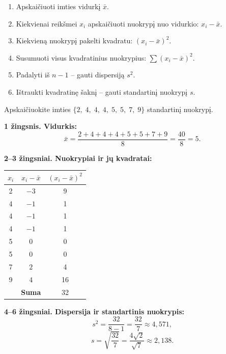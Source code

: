 \begin{enumerate}
  \item Apskaičiuoti imties vidurkį $\bar{x}$.
  \item Kiekvienai reikšmei $x_i$ apskaičiuoti nuokrypį nuo vidurkio: $x_i - \bar{x}$.
  \item Kiekvieną nuokrypį pakelti kvadratu: $(x_i - \bar{x})^2$.
  \item Susumuoti visus kvadratinius nuokrypius: $\sum(x_i - \bar{x})^2$.
  \item Padalyti iš $n - 1$ – gauti dispersiją $s^2$.
  \item Ištraukti kvadratinę šaknį – gauti standartinį nuokrypį $s$.
\end{enumerate}

\begin{example}
Apskaičiuokite imties $\{2,\; 4,\; 4,\; 4,\; 5,\; 5,\; 7,\; 9\}$ standartinį nuokrypį.

\textbf{1 žingsnis. Vidurkis:}
\[
  \bar{x} = \frac{2+4+4+4+5+5+7+9}{8} = \frac{40}{8} = 5.
\]

\textbf{2–3 žingsniai. Nuokrypiai ir jų kvadratai:}

\begin{center}
\begin{tabular}{|c|c|c|}
\hline
$x_i$ & $x_i - \bar{x}$ & $(x_i - \bar{x})^2$ \\
\hline
2 & $-3$ & 9 \\
4 & $-1$ & 1 \\
4 & $-1$ & 1 \\
4 & $-1$ & 1 \\
5 & $0$  & 0 \\
5 & $0$  & 0 \\
7 & $2$  & 4 \\
9 & $4$  & 16 \\
\hline
  & \textbf{Suma} & 32 \\
\hline
\end{tabular}
\end{center}

\textbf{4–6 žingsniai. Dispersija ir standartinis nuokrypis:}
\[
  s^2 = \frac{32}{8 - 1} = \frac{32}{7} \approx 4{,}571,
\]
\[
  s = \sqrt{\frac{32}{7}} = \frac{4\sqrt{2}}{\sqrt{7}} \approx 2{,}138.
\]
\end{example}


